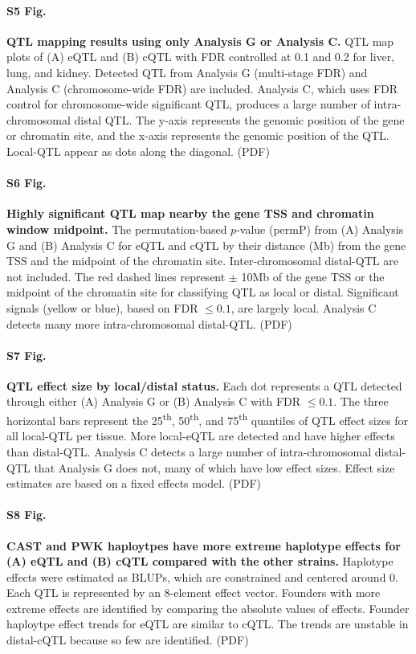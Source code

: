 \documentclass[10pt,letterpaper]{article}
\begin{document}
\paragraph*{S5 Fig.}
\label{S_grid_plot_lenient}
{\bf QTL mapping results using only Analysis G or Analysis C.}
QTL map plots of (A) eQTL and (B) cQTL with FDR controlled at 0.1 and 0.2 for liver, lung, and kidney. Detected QTL from Analysis G (multi-stage FDR) and Analysis C (chromosome-wide FDR) are included. Analysis C, which uses FDR control for chromosome-wide significant QTL, produces a large number of intra-chromosomal distal QTL. The y-axis represents the genomic position of the gene or chromatin site, and the x-axis represents the genomic position of the QTL. Local-QTL appear as dots along the diagonal. (PDF)

\paragraph*{S6 Fig.}
\label{S_dist}
{\bf Highly significant QTL map nearby the gene TSS and chromatin window midpoint.}
The permutation-based $p$-value (permP) from (A) Analysis G and (B) Analysis C for eQTL and cQTL by their distance (Mb) from the gene TSS and the midpoint of the chromatin site. Inter-chromosomal distal-QTL are not included. The red dashed lines represent $\pm$ 10Mb of the gene TSS or the midpoint of the chromatin site for classifying QTL as local or distal. Significant signals (yellow or blue), based on FDR $\le 0.1$, are largely local. Analysis C detects many more intra-chromosomal distal-QTL. (PDF)

\paragraph*{S7 Fig.}
\label{S_effect_size_status}
{\bf QTL effect size by local/distal status.}
Each dot represents a QTL detected through either (A) Analysis G or (B) Analysis C with FDR $\le 0.1$. The three horizontal bars represent the 25\textsuperscript{th}, 50\textsuperscript{th}, and 75\textsuperscript{th} quantiles of QTL effect sizes for all local-QTL per tissue. More local-eQTL are detected and have higher effects than distal-QTL. Analysis C detects a large number of intra-chromosomal distal-QTL that Analysis G does not, many of which have low effect sizes. Effect size estimates are based on a fixed effects model. (PDF)

\paragraph*{S8 Fig.}
\label{S_qtl_effects_abs}
{\bf CAST and PWK haploytpes have more extreme haplotype effects for (A) eQTL and (B) cQTL compared with the other strains.}
Haplotype effects were estimated as BLUPs, which are constrained and centered around 0. Each QTL is represented by an 8-element effect vector. Founders with more extreme effects are identified by comparing the absolute values of effects. Founder haploytpe effect trends for eQTL are similar to cQTL. The trends are unstable in distal-cQTL because so few are identified. (PDF)
\end{document}
